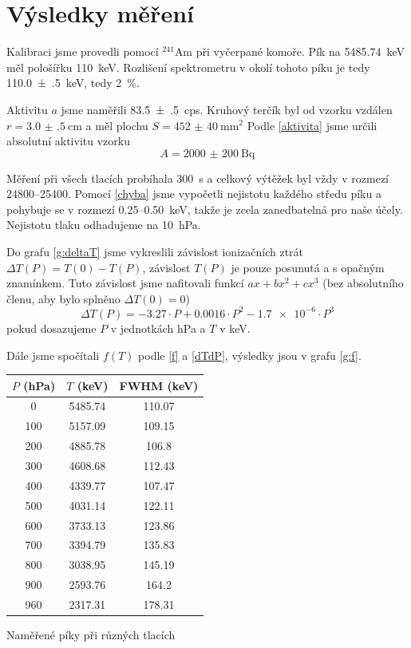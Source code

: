 \section*{Výsledky měření}
Kalibraci jsme provedli pomocí $^{241}$Am při vyčerpané komoře.
Pík na \SI{5485.74}{\keV} měl pološířku \SI{110}{\keV}. Rozlišení spektrometru v okolí tohoto píku je tedy \SI{110.0(5)}{\keV}, tedy \SI{2}{\percent}.

Aktivitu $a$ jsme naměřili \SI{83.5(5)}{cps}. 
Kruhový terčík byl od vzorku vzdálen $r=\SI{3.0(5)}{\cm}$ a měl plochu $S=\SI{452(40)}{\mm\squared}$
Podle \eqref{aktivita} jsme určili absolutní aktivitu vzorku
\begin{equation*}
A=\SI{2000(200)}{\becquerel}
\end{equation*}

Měření při všech tlacích probíhala \SI{300}{\s} a celkový výtěžek byl vždy v rozmezí \num{24800}--\num{25400}. Pomocí \eqref{chyba} jsme vypočetli nejistotu každého středu píku a pohybuje se v rozmezí \num{0.25}--\SI{0.50}{\keV}, takže je zcela zanedbatelná pro naše účely. Nejistotu tlaku odhadujeme na \SI{10}{\hecto\pascal}.

Do grafu \ref{g:deltaT} jsme vykreslili závislost ionizačních ztrát $\Delta T(P)=T(0)-T(P)$, závislost $T(P)$ je pouze posunutá a s opačným znamínkem. Tuto závislost jsme nafitovali funkcí $ax+bx^2+cx^3$ (bez absolutního členu, aby bylo splněno $\Delta T(0)=0$)
\begin{equation*}
\Delta T(P)=\num{-3.27}\cdot P +0.0016 \cdot P^2 -\num{1.7e-6} \cdot P^3
\end{equation*}
pokud dosazujeme $P$ v jednotkách \si{\hecto\pascal} a $T$ v \si{\keV}.

Dále jsme spočítali $f(T)$ podle \eqref{f} a \eqref{dTdP}, výsledky jsou v grafu \ref{g:f}.



\begin{tabulka}[htbp]
\centering
\begin{tabular}{c|cc}
$P$ (\si{\hecto\Pa}) & $T$ (\si{\keV}) & FWHM (\si{\keV}) \\\hline
\num{0}  &\num{5485.74} & \num{110.07} \\ 
\num{100}&\num{5157.09} & \num{109.15} \\ 
\num{200}&\num{4885.78} & \num{106.8} \\ 
\num{300}&\num{4608.68} & \num{112.43} \\ 
\num{400}&\num{4339.77} & \num{107.47} \\ 
\num{500}&\num{4031.14} & \num{122.11} \\ 
\num{600}&\num{3733.13} & \num{123.86} \\ 
\num{700}&\num{3394.79} & \num{135.83} \\ 
\num{800}&\num{3038.95} & \num{145.19} \\ 
\num{900}&\num{2593.76} & \num{164.2} \\ 
\num{960}&\num{2317.31} & \num{178.31} \\ 
\hline
\end{tabular}
\caption{Naměřené píky při různých tlacích}
\label{t:vysledky}
\end{tabulka}



